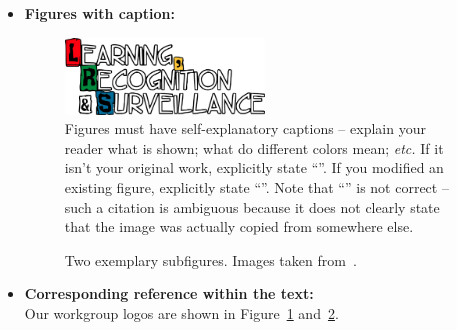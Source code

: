 \documentclass[11pt,a4paper]{article}
\begin{document}
\begin{texexample}
  \label{ex-fig}
  \begin{itemize}[leftmargin=1em]

  \item \textbf{Figures with caption:}
  \begin{figure}[H]
    \centering
    \includegraphics[width=0.5\textwidth]{slide-refs/theme-lrs/logo_lrs}
    \caption{Figures must have self-explanatory captions -- explain your reader what is shown; what do different colors mean; \emph{etc.} If it isn't your original work, explicitly state ``''.
    If you modified an existing figure, explicitly state ``''.
    Note that ``'' is not correct -- such a citation is ambiguous because it does not clearly state that the image was actually copied from somewhere else.}
    \label{fig-example1}
  \end{figure}
  \vspace{-0.3em}
  \begin{figure}[H]
    \centering
    \hspace{0.5cm}
    \caption{Two exemplary subfigures. Images taken from~.}
    \label{fig-example2}
  \end{figure}
  
  \item\textbf{Corresponding reference within the text:}\\
  Our workgroup logos are shown in Figure~\ref{fig-example1} and~\ref{fig-example2}.
  \end{itemize}
  \vspace{0.5cm}
\end{texexample}
\end{document}
